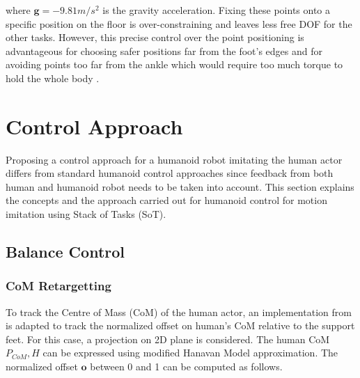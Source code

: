 where $\mathbf{g} = -9.81 m/s^2$ is the gravity acceleration. Fixing these points onto a specific position on the floor is 
over-constraining and leaves less free DOF for the other tasks. However, this precise control over the point positioning is advantageous
for choosing safer positions far from the foot’s edges and for avoiding points too far from the ankle which would require too much torque
to hold the whole body \cite{louisepouble}.


\section{Control Approach}

Proposing a control approach for a humanoid robot imitating the human actor differs from standard humanoid control approaches since 
feedback from both human and humanoid robot needs to be taken into account. This section explains the concepts and the approach 
carried out for humanoid control for motion imitation using Stack of Tasks (SoT).

\subsection{Balance Control}
\label{sec: balance-control}
\subsubsection{CoM Retargetting}

To track the Centre of Mass (CoM) of the human actor, an implementation from \cite{penco:hal-01895145} is adapted to track the normalized offset on
human's CoM relative to the support feet. For this case, a projection on 2D plane is considered. The human CoM $P_{CoM}, H$ can be 
expressed using modified Hanavan Model approximation. The normalized offset $\mathbf{o}$ between 0 and 1 can be computed as follows.


